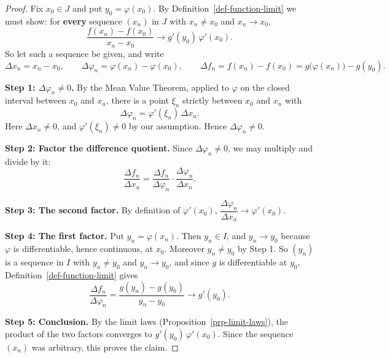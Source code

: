 \documentclass[
  letterpaper,
  DIV=11,
  numbers=noendperiod]{scrreprt}
\theoremstyle{plain}
\theoremstyle{plain}
\theoremstyle{definition}
\theoremstyle{definition}
\theoremstyle{definition}
\theoremstyle{plain}
\theoremstyle{plain}
\theoremstyle{remark}
\begin{document}
\begin{proof}
Fix \(x_0\in J\) and put \(y_0 = \varphi(x_0)\). By
Definition~\ref{def-function-limit} we must show: for \textbf{every}
sequence \((x_n)\) in \(J\) with \(x_n\neq x_0\) and \(x_n\to x_0\), \[
\frac{f(x_n)-f(x_0)}{x_n-x_0}\longrightarrow g'(y_0)\,\varphi'(x_0).
\] So let such a sequence be given, and write \[
\Delta x_n = x_n - x_0, \qquad
\Delta\varphi_n = \varphi(x_n)-\varphi(x_0), \qquad
\Delta f_n = f(x_n)-f(x_0) = g\big(\varphi(x_n)\big) - g(y_0).
\]

\textbf{Step 1: \(\Delta\varphi_n\neq0\).} By the Mean Value Theorem,
applied to \(\varphi\) on the closed interval between \(x_0\) and
\(x_n\), there is a point \(\xi_n\) strictly between \(x_0\) and \(x_n\)
with \[
\Delta\varphi_n = \varphi'(\xi_n)\,\Delta x_n .
\] Here \(\Delta x_n\neq0\), and \(\varphi'(\xi_n)\neq0\) by our
assumption. Hence \(\Delta\varphi_n\neq0\).

\textbf{Step 2: Factor the difference quotient.} Since
\(\Delta\varphi_n\neq0\), we may multiply and divide by it: \[
\frac{\Delta f_n}{\Delta x_n} = \frac{\Delta f_n}{\Delta\varphi_n}\cdot\frac{\Delta\varphi_n}{\Delta x_n}.
\]

\textbf{Step 3: The second factor.} By definition of \(\varphi'(x_0)\),
\(\dfrac{\Delta\varphi_n}{\Delta x_n}\to\varphi'(x_0)\).

\textbf{Step 4: The first factor.} Put \(y_n = \varphi(x_n)\). Then
\(y_n\in I\), and \(y_n\to y_0\) because \(\varphi\) is differentiable,
hence continuous, at \(x_0\). Moreover \(y_n\neq y_0\) by Step 1. So
\((y_n)\) is a sequence in \(I\) with \(y_n\neq y_0\) and
\(y_n\to y_0\), and since \(g\) is differentiable at \(y_0\),
Definition~\ref{def-function-limit} gives \[
\frac{\Delta f_n}{\Delta\varphi_n} = \frac{g(y_n)-g(y_0)}{y_n-y_0}\longrightarrow g'(y_0).
\]

\textbf{Step 5: Conclusion.} By the limit laws
(Proposition~\ref{prp-limit-laws}), the product of the two factors
converges to \(g'(y_0)\,\varphi'(x_0)\). Since the sequence \((x_n)\)
was arbitrary, this proves the claim.
\end{proof}
\end{document}
